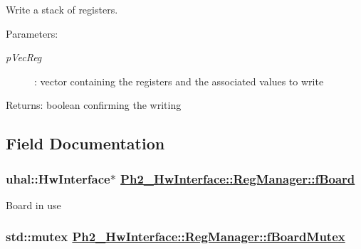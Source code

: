 Write a stack of registers. 

\begin{Desc}
\item[Parameters:]
\begin{description}
\item[{\em p\-Vec\-Reg}]: vector containing the registers and the associated values to write \end{description}
\end{Desc}
\begin{Desc}
\item[Returns:]boolean confirming the writing \end{Desc}


\subsection{Field Documentation}
\hypertarget{class_ph2___hw_interface_1_1_reg_manager_0d4908ec834a3a0b7d8139872fd0a4a0}{
\subsubsection[fBoard]{\setlength{\rightskip}{0pt plus 5cm}uhal::Hw\-Interface$\ast$ \hyperlink{class_ph2___hw_interface_1_1_reg_manager_0d4908ec834a3a0b7d8139872fd0a4a0}{Ph2\_\-Hw\-Interface::Reg\-Manager::f\-Board}}}
\label{class_ph2___hw_interface_1_1_reg_manager_0d4908ec834a3a0b7d8139872fd0a4a0}


Board in use \hypertarget{class_ph2___hw_interface_1_1_reg_manager_b5fdbe722820897d3a1344f300cc4a92}{
\subsubsection[fBoardMutex]{\setlength{\rightskip}{0pt plus 5cm}std::mutex \hyperlink{class_ph2___hw_interface_1_1_reg_manager_b5fdbe722820897d3a1344f300cc4a92}{Ph2\_\-Hw\-Interface::Reg\-Manager::f\-Board\-Mutex}}}
\label{class_ph2___hw_interface_1_1_reg_manager_b5fdbe722820897d3a1344f300cc4a92}


